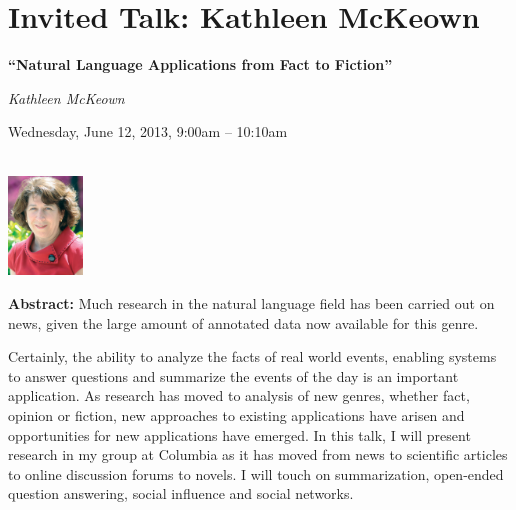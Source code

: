 \section{Invited Talk: Kathleen McKeown}
\begin{center}

\begin{Large}
{\bfseries\Large ``Natural Language Applications from Fact to Fiction''}\vspace{1em}\par
\end{Large}

{\itshape Kathleen McKeown}\vspace{1em}\par
Wednesday, June 12, 2013, 9:00am -- 10:10am \vspace{1em}\\
\PlenaryLoc \\
\vspace{1em}\par
\includegraphics[height=100px]{content/day4/mckeown-headshot.pdf}
\end{center}

\noindent
{\bfseries Abstract:} Much research in the natural language field has been carried out on news, given the large amount of annotated data now available for this genre.

Certainly, the ability to analyze the facts of real world events, enabling systems to answer questions and summarize the events of the day is an important application. As research has moved to analysis of new genres, whether fact, opinion or fiction, new approaches to existing applications have arisen and opportunities for new applications have emerged. In this talk, I will present research in my group at Columbia as it has moved from news to scientific articles to online discussion forums to novels. I will touch on summarization, open-ended question answering, social influence and social networks.

\vspace{3em}\par 

